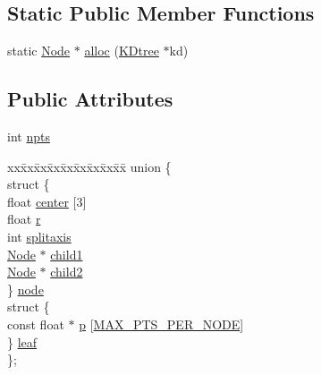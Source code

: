 \subsection*{Static Public Member Functions}
\begin{DoxyCompactItemize}
\item 
static \hyperlink{structtrimesh_1_1KDtree_1_1Node}{Node} $\ast$ \hyperlink{structtrimesh_1_1KDtree_1_1Node_aafbaa1988b404387fdecaebe976054d4}{alloc} (\hyperlink{classtrimesh_1_1KDtree}{K\+Dtree} $\ast$kd)
\end{DoxyCompactItemize}
\subsection*{Public Attributes}
\begin{DoxyCompactItemize}
\item 
int \hyperlink{structtrimesh_1_1KDtree_1_1Node_af0fca1ed6e7ea9f214eeee668c2a8564}{npts}
\item 
\begin{tabbing}
xx\=xx\=xx\=xx\=xx\=xx\=xx\=xx\=xx\=\kill
union \{\\
\>struct \{\\
\>\>float \hyperlink{structtrimesh_1_1KDtree_1_1Node_af9100b85e1af4914dc2ba23157d9d00d}{center} \mbox{[}3\mbox{]}\\
\>\>float \hyperlink{structtrimesh_1_1KDtree_1_1Node_a33b915701d1e8dc443a8c71b9956d7e0}{r}\\
\>\>int \hyperlink{structtrimesh_1_1KDtree_1_1Node_a03465bb23fce977d96e7c4d78a89a2bc}{splitaxis}\\
\>\>\hyperlink{structtrimesh_1_1KDtree_1_1Node}{Node} $\ast$ \hyperlink{structtrimesh_1_1KDtree_1_1Node_aab53e98bbfd16091a1e87ee157df5439}{child1}\\
\>\>\hyperlink{structtrimesh_1_1KDtree_1_1Node}{Node} $\ast$ \hyperlink{structtrimesh_1_1KDtree_1_1Node_ab0959270fb127073b140565e84e412dc}{child2}\\
\>\} \hyperlink{structtrimesh_1_1KDtree_1_1Node_ab28bb219bf920c91ce7a7ee45df0128b}{node}\\
\>struct \{\\
\>\>const float $\ast$ \hyperlink{structtrimesh_1_1KDtree_1_1Node_a4686afc5881e4f3364ed8ef3f6a74924}{p} \mbox{[}\hyperlink{structtrimesh_1_1KDtree_1_1Node_a1416dc745c17c28b906e41698ef25fd6a3b052d5faa949e7df63472f40af97624}{MAX\_PTS\_PER\_NODE}\mbox{]}\\
\>\} \hyperlink{structtrimesh_1_1KDtree_1_1Node_a1e1c09c2b753fb9e4459ee4ca5cfdb41}{leaf}\\
\}; \\

\end{tabbing}\end{DoxyCompactItemize}



